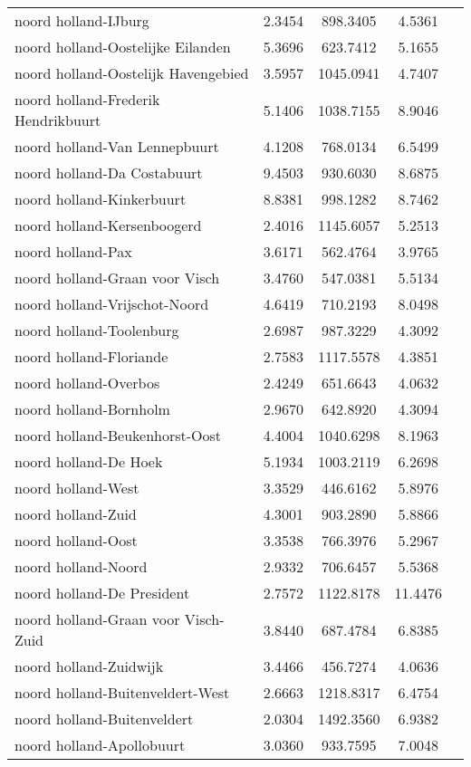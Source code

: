\begin{longtable}{llccc}
noord holland-IJburg & 2.3454 & 898.3405 & 4.5361 \\
noord holland-Oostelijke Eilanden & 5.3696 & 623.7412 & 5.1655 \\
noord holland-Oostelijk Havengebied & 3.5957 & 1045.0941 & 4.7407 \\
noord holland-Frederik Hendrikbuurt & 5.1406 & 1038.7155 & 8.9046 \\
noord holland-Van Lennepbuurt & 4.1208 & 768.0134 & 6.5499 \\
noord holland-Da Costabuurt & 9.4503 & 930.6030 & 8.6875 \\
noord holland-Kinkerbuurt & 8.8381 & 998.1282 & 8.7462 \\
noord holland-Kersenboogerd & 2.4016 & 1145.6057 & 5.2513 \\
noord holland-Pax & 3.6171 & 562.4764 & 3.9765 \\
noord holland-Graan voor Visch & 3.4760 & 547.0381 & 5.5134 \\
noord holland-Vrijschot-Noord & 4.6419 & 710.2193 & 8.0498 \\
noord holland-Toolenburg & 2.6987 & 987.3229 & 4.3092 \\
noord holland-Floriande & 2.7583 & 1117.5578 & 4.3851 \\
noord holland-Overbos & 2.4249 & 651.6643 & 4.0632 \\
noord holland-Bornholm & 2.9670 & 642.8920 & 4.3094 \\
noord holland-Beukenhorst-Oost & 4.4004 & 1040.6298 & 8.1963 \\
noord holland-De Hoek & 5.1934 & 1003.2119 & 6.2698 \\
noord holland-West & 3.3529 & 446.6162 & 5.8976 \\
noord holland-Zuid & 4.3001 & 903.2890 & 5.8866 \\
noord holland-Oost & 3.3538 & 766.3976 & 5.2967 \\
noord holland-Noord & 2.9332 & 706.6457 & 5.5368 \\
noord holland-De President & 2.7572 & 1122.8178 & 11.4476 \\
noord holland-Graan voor Visch-Zuid & 3.8440 & 687.4784 & 6.8385 \\
noord holland-Zuidwijk & 3.4466 & 456.7274 & 4.0636 \\
noord holland-Buitenveldert-West & 2.6663 & 1218.8317 & 6.4754 \\
noord holland-Buitenveldert & 2.0304 & 1492.3560 & 6.9382 \\
noord holland-Apollobuurt & 3.0360 & 933.7595 & 7.0048 \\

\end{longtable}
